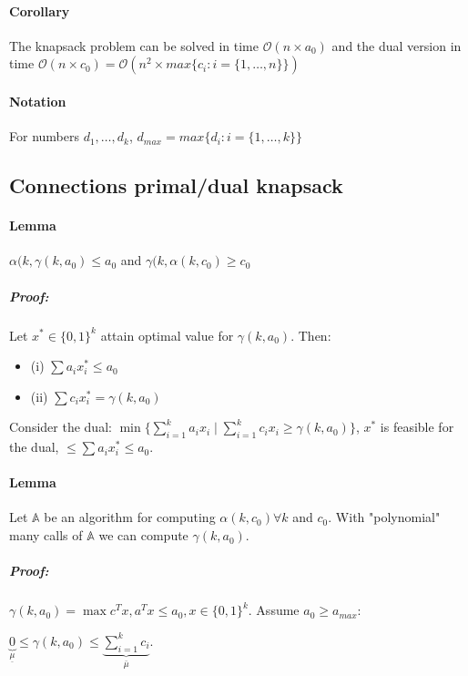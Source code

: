 \documentclass[main]{subfiles}
\begin{document}
\paragraph{Corollary} The knapsack problem can be solved in time
$\mathcal{O}(n \times a_{0})$ and the dual version in time
$\mathcal{O}(n \times c_{0}) = \mathcal{O}(n^{2} \times max\{c_{i}: i =
\{1, \dots, n\}\})$

\paragraph{Notation} For numbers $d_{1}, \dots, d_{k}$, $d_{max} = max\{d_{i}:
i =\{1, \dots, k\} \}$

\subsection{Connections primal/dual knapsack}

\paragraph{Lemma} $\alpha(k, \gamma(k, a_{0}) \leq a_{0}$ and $\gamma(k,
\alpha(k, c_{0}) \geq c_{0}$

\subparagraph{Proof:}
Let $x^{*} \in \{0,1\}^{k}$ attain optimal value for $\gamma(k, a_{0})$.
Then:
\begin{itemize}
\itemsep0em
\item (i) $\sum a_{i}x_{i}^{*} \leq a_{0}$
\item (ii) $\sum c_{i}x_{i}^{*} = \gamma(k, a_{0})$
\end{itemize}

Consider the dual: $\min \{\sum_{i=1}^{k} a_i x_{i} \mid \sum_{i=1}^{k}
c_{i} x_{i} \geq \gamma(k, a_{0})\}$, $x^{*}$ is feasible for the dual,
$\leq \sum a_{i}x_{i}^{*} \leq a_{0}$.

\paragraph{Lemma} Let $\mathbb{A}$ be an algorithm for computing
$\alpha(k, c_{0}) \forall k$ and $c_{0}$. With "polynomial" many calls of
$\mathbb{A}$ we can compute $\gamma(k, a_{0})$.

\subparagraph{Proof:}
$\gamma(k, a_{0}) = \max c^{T}x, a^{T}x \leq a_{0}, x \in \{0,1\}^{k}$.
Assume $a_{0} \geq a_{max}$:

$\underbrace{0}_{\underline{\mu}} \leq \gamma(k, a_{0}) \leq
\underbrace{\sum_{i=1}^{k}c_{i}}_{\bar{\mu}}$.
\end{document}
